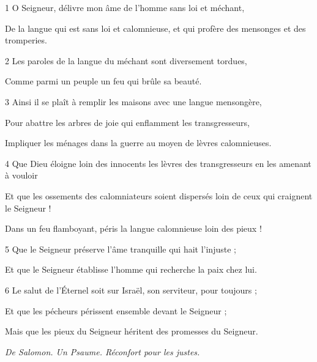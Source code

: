 \par 1 O Seigneur, délivre mon âme de l'homme sans loi et méchant,
\par     De la langue qui est sans loi et calomnieuse, et qui profère des mensonges et des tromperies.
\par 2 Les paroles de la langue du méchant sont diversement tordues,
\par     Comme parmi un peuple un feu qui brûle sa beauté.
\par 3 Ainsi il se plaît à remplir les maisons avec une langue mensongère,
\par     Pour abattre les arbres de joie qui enflamment les transgresseurs,
\par     Impliquer les ménages dans la guerre au moyen de lèvres calomnieuses.
\par   
\par 4 Que Dieu éloigne loin des innocents les lèvres des transgresseurs en les amenant à vouloir
\par     Et que les ossements des calomniateurs soient dispersés loin de ceux qui craignent le Seigneur !
\par     Dans un feu flamboyant, péris la langue calomnieuse loin des pieux !
\par 5 Que le Seigneur préserve l'âme tranquille qui hait l'injuste ;
\par     Et que le Seigneur établisse l'homme qui recherche la paix chez lui.
\par 6 Le salut de l'Éternel soit sur Israël, son serviteur, pour toujours ;
\par     Et que les pécheurs périssent ensemble devant le Seigneur ;
\par     Mais que les pieux du Seigneur héritent des promesses du Seigneur.


\par \textit{De Salomon. Un Psaume. Réconfort pour les justes.}

